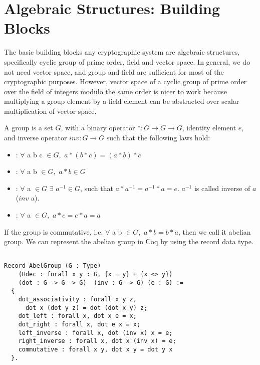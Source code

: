 \section{Algebraic Structures: Building Blocks}
\label{sec:algebra}
The basic building blocks any cryptographic system are algebraic structures, specifically cyclic group of prime order, field and vector space. In general, 
we do not need vector space, and group and field are sufficient for most of the cryptographic purposes. However,
vector space  of a cyclic group of prime order over the field of integers modulo the same order is nicer to work 
because multiplying a group element by a field element can be abstracted over scalar multiplication of vector space.

\begin{definition}[Group] 
A group is a set $G$, with a binary operator $* : G \rightarrow G \rightarrow G$, identity element $e$, and inverse operator $inv : G \rightarrow G$ such 
    that the following laws hold:  \end{definition} 
    \begin{itemize}
     \item {}: $\forall$  a b c $\in G,$  $a * (b * c) = (a * b) * c$
    \item {}: $\forall$ a b $\in G,$  $a * b \in G$
    \item {}: $\forall$ a $\in G$ $\exists$ $a^{-1} \in G$, such that $a * a^{-1} = a^{-1} * a = e$. $a^{-1}$ is called inverse of $a$ ($inv$ a).
    \item {}: $\forall$ a $\in G,$  $a * e = e * a  = a$
    \end{itemize}
  
    \noindent
    If the group is commutative, i.e. $\forall$ a b $\in  G,$  $a * b = b * a$, then we call it abelian group.  We can represent the abelian group in Coq by using the 
    record data type. 
 
 \begin{verbatim}

Record AbelGroup (G : Type) 
    (Hdec : forall x y : G, {x = y} + {x <> y}) 
    (dot : G -> G -> G)  (inv : G -> G) (e : G) :=
  {
    dot_associativity : forall x y z, 
      dot x (dot y z) = dot (dot x y) z;
    dot_left : forall x, dot x e = x;
    dot_right : forall x, dot e x = x;
    left_inverse : forall x, dot (inv x) x = e;
    right_inverse : forall x, dot x (inv x) = e;
    commutative : forall x y, dot x y = dot y x
  }.
  
\end{verbatim}    

